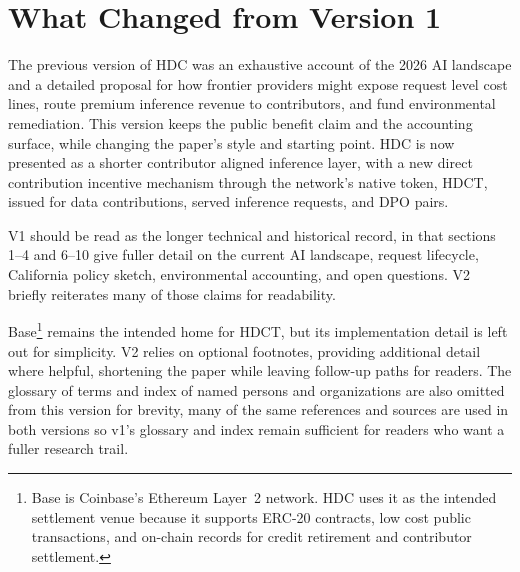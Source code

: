 \documentclass[10pt,a4paper,twocolumn]{article}
\begin{document}
\clearpage
\section*{What Changed from Version 1}

The previous version of HDC was an exhaustive account of the 2026 AI landscape and a detailed proposal for how frontier providers might expose request level cost lines, route premium inference revenue to contributors, and fund environmental remediation. This version keeps the public benefit claim and the accounting surface, while changing the paper's style and starting point. HDC is now presented as a shorter contributor aligned inference layer, with a new direct contribution incentive mechanism through the network's native token, HDCT, issued for data contributions, served inference requests, and DPO pairs.

V1 should be read as the longer technical and historical record, in that sections 1--4 and 6--10 give fuller detail on the current AI landscape, request lifecycle, California policy sketch, environmental accounting, and open questions. V2 briefly reiterates many of those claims for readability.

Base\footnote{Base is Coinbase's Ethereum Layer~2 network. HDC uses it as the intended settlement venue because it supports ERC-20 contracts, low cost public transactions, and on-chain records for credit retirement and contributor settlement.} remains the intended home for HDCT, but its implementation detail is left out for simplicity. V2 relies on optional footnotes, providing additional detail where helpful, shortening the paper while leaving follow-up paths for readers. The glossary of terms and index of named persons and organizations are also omitted from this version for brevity, many of the same references and sources are used in both versions so v1's glossary and index remain sufficient for readers who want a fuller research trail.
\end{document}

